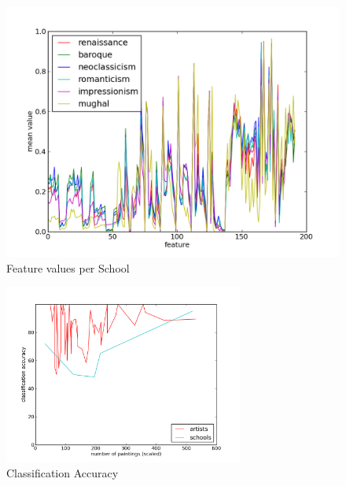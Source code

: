 \documentclass[11pt,a4paper,twoside,openright,draft]{report}
\begin{document}
\begin{multicols}{2}
\begin{figure}[tbp]
\centering
\includegraphics[width=\textwidth]{school-graph}
\caption[Feature Values]{Feature values per School}
\label{fig:school}
\end{figure}

\begin{figure}[tbp]
\centering
\includegraphics[width=0.7\textwidth]{class-graph}
\caption[Classification]{Classification Accuracy}
\label{fig:class}
\end{figure}

\end{multicols}
\end{document}

